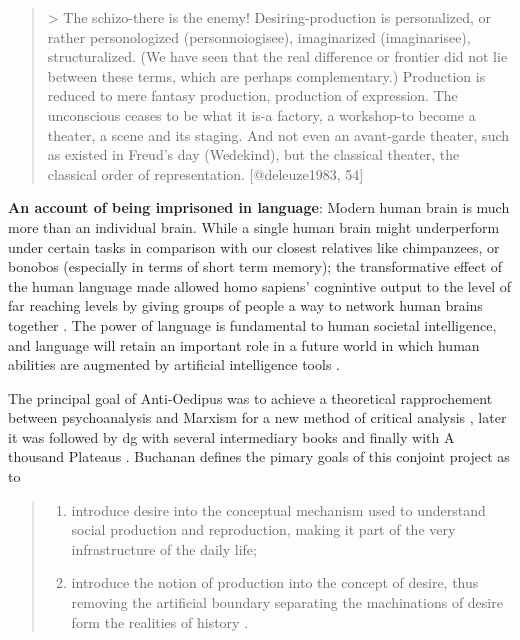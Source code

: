 \begin{tcolorbox}
\begin{todolist}
		\begin{quote}
			> The schizo-there is the enemy! Desiring-production is personalized, or rather personologized (personnoiogisee), imaginarized (imaginarisee), structuralized. (We have seen that the real difference or frontier did not lie between these terms, which are perhaps complementary.) Production is reduced to mere fantasy production, production of expression. The unconscious ceases to be what it is-a factory, a workshop-to become a theater, a scene and its staging. And not even an avant-garde theater, such as existed in Freud's day (Wedekind), but the classical theater, the classical order of representation. [@deleuze1983, 54]
		\end{quote}

		\item \textbf{An account of being imprisoned in language}:
		Modern human brain is much more than an individual brain. While a single
		human brain might underperform under certain tasks in comparison with our
		closest relatives like chimpanzees, or bonobos (especially in terms of
		short term memory); the transformative effect of the human language made
		allowed homo sapiens' cognintive output to the level of far reaching levels by giving groups of people a way to network human brains together \parencite[see 127]{manning2022a} . The power of language is fundamental to human societal intelligence, and language will retain an important role in a future world in which human abilities are augmented by artificial intelligence tools \parencite[127]{manning2022a}.

	\end{todolist}
\end{tcolorbox}


The principal goal of Anti-Oedipus \cite*{deleuze1983} was to achieve a theoretical rapprochement between psychoanalysis and Marxism for a new method of critical analysis \cite[39]{buchanan2008b}, later it was followed by \gls{dg} with several intermediary books and finally with A thousand Plateaus \cite*{deleuze1987}. Buchanan \cite*{buchanan2008b} defines the pimary goals of this conjoint project as to
\begin{quote}
	\begin{enumerate}
		\item introduce desire into the conceptual mechanism used to understand social production and reproduction, making it part of the very infrastructure of the daily life;
		\item introduce the notion of production into the concept  of desire,  thus removing the artificial boundary separating the machinations of desire form the realities of history \cite[39-42]{buchanan2008b}.
	\end{enumerate}
\end{quote}

